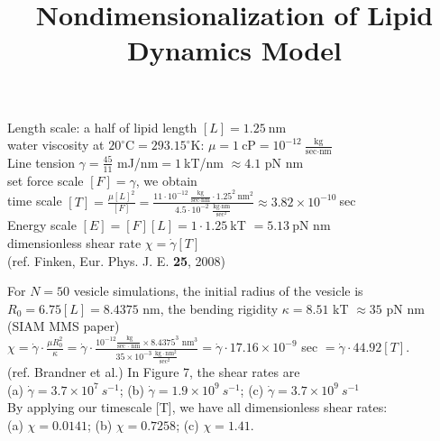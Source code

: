 \documentclass[12pt,letterpaper, onecolumn]{article}
\begin{document}
\title{Nondimensionalization of Lipid Dynamics Model}
\maketitle


Length scale: a half of lipid length $[L]=1.25\ \text{nm}$\\

water viscosity at $20^\circ$C$=293.15^\circ$K: $\mu=1\ \text{cP}= 10^{-12}\ \frac{\text{kg}}{\text{sec}\cdot\text{nm}}$  \\

Line tension $\gamma=\frac{45}{11}$ mJ/nm$=1\ $kT/nm $\approx 4.1$ pN nm\\

set force scale $[F]=\gamma$, we obtain\\

time scale $\displaystyle [T] = \frac{\mu [L]^2}{[F]} = \frac{11\cdot 10^{-12}\ \frac{\text{kg}}{\text{sec}\cdot\text{nm}}\cdot 1.25^2\ \text{nm}^2}
{4.5\cdot10^{-2}\ \frac{\text{kg}\cdot\text{nm}}{\text{sec}^2}} 
\approx 3.82\times10^{-10}\ $sec\\

Energy scale $[E] = [F][L] = 1\cdot1.25\ $kT $= 5.13\ $pN nm\\


dimensionless shear rate $\chi = \dot\gamma [T]$\\


(ref. Finken, Eur. Phys. J. E. {\bf 25}, 2008) 


For $N=50$ vesicle simulations, the initial radius of the vesicle is \\ $R_0=6.75 [L] = 8.4375$ nm, the bending rigidity $\kappa=8.51$ kT $\approx35$ pN nm (SIAM MMS paper)\\

$\chi = \dot\gamma \cdot\frac{\mu R_0^2}{\kappa} = \dot\gamma \cdot\frac{  10^{-12}\frac{\text{ kg}}{\text{sec $\cdot$ nm}} \times 8.4375^3 \text{ nm}^3}{ 35\times 10^{-3} \frac{\text{ kg}\cdot\text{nm}^2}{\text{sec}^2}} = \dot\gamma \cdot 17.16\times10^{-9}$ sec $ = \dot\gamma \cdot 44.92[T]$. \\


(ref. Brandner et al.)
In Figure 7, the shear rates are \\(a) $\dot\gamma = 3.7\times10^7\ s^{-1}$; (b) $\dot\gamma = 1.9\times10^9\ s^{-1}$; (c) $\dot\gamma = 3.7\times10^9\ s^{-1}$\\

By applying our timescale [T], we have all dimensionless shear rates: \\
(a) $\chi = 0.0141$; (b) $\chi = 0.7258$; (c) $\chi = 1.41$.\\
\end{document}
